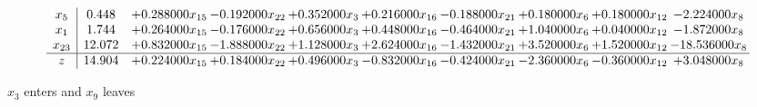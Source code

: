 \documentclass[10pt]{article}
\begin{document}
\[\begin{array}{c| c c@{\hskip 2pt} c@{\hskip 2pt} c@{\hskip 2pt} c@{\hskip 2pt} c@{\hskip 2pt} c@{\hskip 2pt} c@{\hskip 2pt} c@{\hskip 2pt} }
 x_{5}   &  0.448 & + 0.288000 x_{15} & -0.192000 x_{22} & + 0.352000 x_{3} & + 0.216000 x_{16} & -0.188000 x_{21} & + 0.180000 x_{6} & + 0.180000 x_{12} & -2.224000 x_{8}\\
 x_{1}   &  1.744 & + 0.264000 x_{15} & -0.176000 x_{22} & + 0.656000 x_{3} & + 0.448000 x_{16} & -0.464000 x_{21} & + 1.040000 x_{6} & + 0.040000 x_{12} & -1.872000 x_{8}\\
 x_{23}   &  12.072 & + 0.832000 x_{15} & -1.888000 x_{22} & + 1.128000 x_{3} & + 2.624000 x_{16} & -1.432000 x_{21} & + 3.520000 x_{6} & + 1.520000 x_{12} & -18.536000 x_{8}\\
\hline
z    &  14.904 & + 0.224000 x_{15} & + 0.184000 x_{22} & + 0.496000 x_{3} & -0.832000 x_{16} & -0.424000 x_{21} & -2.360000 x_{6} & -0.360000 x_{12} & + 3.048000 x_{8}\\
\end{array}\]


 $ x_{3} $ enters and $ x_{9} $ leaves 
\end{document}
